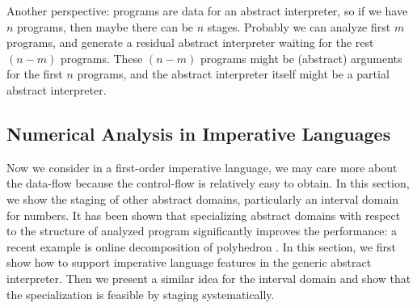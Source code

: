 \iffalse
\paragraph{Partially-Static Context} Under a polyvariant analysis (like
$k$-CFA), such summary generated by specializing static analyzer even could do
more for calling context by partially-static data optimization. For example,
consider that we have a library consists of three functions @f@, @g@ and @h@,
where @f@ calls @g@ and @h@ internally and returns @y@ finally (we extend the
language to have multiple arguments). @g@ and @h@ do not depend on @f@. Now we
would like to modularly specialize these functions, starting from @f@ with an
initial environment containing @f@, @g@ and @h@.
\begin{lstlisting}
  def f(a, b, c) = val x = g(a, b); val y = h(x, c);  y
\end{lstlisting}

Since $k$ is bounded to a fixed number, after the analysis running $k$ steps
inside of @f@, the calling context will purely depend on the static structure of
our module being analyzed.
\fi


\iffalse
Another perspective: programs are data for an abstract interpreter, so if we
have $n$ programs, then maybe there can be $n$ stages. Probably we can analyze
first $m$ programs, and generate a residual abstract interpreter waiting for the
rest $(n-m)$ programs. These $(n-m)$ programs might be (abstract) arguments for
the first $n$ programs, and the abstract interpreter itself might be a partial
abstract interpreter.

\subsection{Numerical Analysis in Imperative Languages} \label{cases_imp}

Now we consider in a first-order imperative language, we may care more about the
data-flow because the control-flow is relatively easy to obtain. In this
section, we show the staging of other abstract domains, particularly an interval
domain for numbers. It has been shown that specializing abstract domains with
respect to the structure of analyzed program significantly improves the
performance: a recent example is online decomposition of polyhedron
\cite{DBLP:conf/popl/SinghPV17, Singh:2017:PCD:3177123.3158143}. In this
section, we first show how to support imperative language features in the
generic abstract interpreter. Then we present a similar idea for the interval
domain and show that the specialization is feasible by staging systematically.

